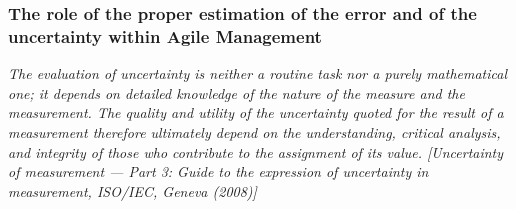 \documentclass{article}
\begin{document}

\newpage
\subsubsection{The role of the proper estimation of the error and of the uncertainty within Agile Management}
\textit{The evaluation of uncertainty is neither a routine task nor a purely mathematical one; it depends
on detailed knowledge of the nature of the measure and the measurement. The quality and
utility of the uncertainty quoted for the result of a measurement therefore ultimately depend on the
understanding, critical analysis, and integrity of those who contribute to the assignment of its value.
[Uncertainty of measurement — Part 3: Guide to the expression of uncertainty in measurement,
ISO/IEC, Geneva (2008)]}
\end{document}

